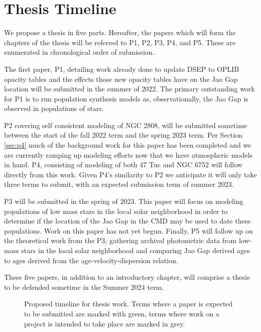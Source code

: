 \section{Thesis Timeline}
We propose a thesis in five parts. Hereafter, the papers which will form the
chapters of the thesis will be referred to P1, P2, P3, P4, and P5. These are
enumerated in chronological order of submission.

The first paper, P1, detailing work already done to update DSEP to OPLIB opacity
tables and the effects those new opacity tables have on the Jao Gap location
will be submitted in the summer of 2022. The primary outstanding work for P1 
is to run population synthesis models as, observationally, the Jao Gap is
observed in populations of stars.

P2 covering self consistent modeling of NGC 2808, will be submitted sometime
between the start of the fall 2022 term and the spring 2023 term. Per Section
\ref{sec:p4} much of the background work for this paper has been completed and we are
currently ramping up modeling efforts now that we have atmospheric models in
hand. P4, consisting of modeling of both 47 Tuc and NGC 6752 will follow directly
from this work. Given P4's similarity to P2 we anticipate it will only take
three terms to submit, with an expected submission term of summer 2023.

P3 will be submitted in the spring of 2023. This paper will focus on modeling
populations of low mass stars in the local solar neighborhood in order to
determine if the location of the Jao Gap in the CMD may be used to date these
populations. Work on this paper has not yet begun. Finally, P5 will follow up
on the theoretical work from the P3; gathering archival photometric data from
low-mass stars in the local solar neighborhood and comparing Jao Gap derived
ages to ages derived from the age-velocity-dispersion relation.

These five papers, in addition to an introductory chapter, will comprise a thesis
to be defended sometime in the Summer 2024 term.

\begin{figure}
	\centering
	
	\caption{Proposed timeline for thesis work. Terms where a paper is expected
	to be submitted are marked with green, terms where work on a project is intended
	to take place are marked in grey.}
	\label{fig:timeline}
\end{figure}
